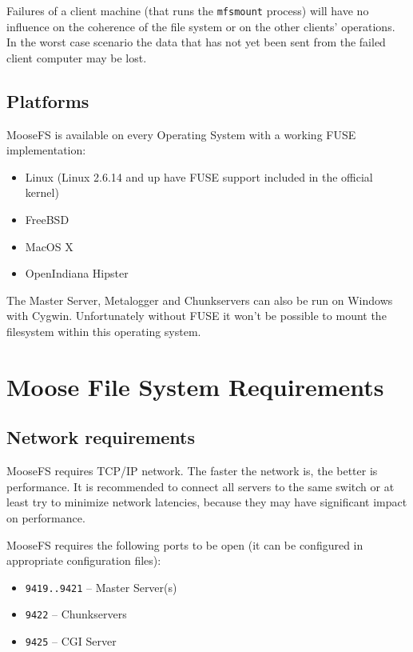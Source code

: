 \documentclass[a4paper,11pt,english]{report}
\def\code#1{\texttt{#1}}
\begin{document}
		Failures of a client machine (that runs the \code{mfsmount} process) will have no influence on the coherence of the file system or on the other clients' operations. In the worst case scenario the data that has not yet been sent from the failed client computer may be lost.
		
		\section{Platforms}
		MooseFS is available on every Operating System with a working FUSE implementation:
		\begin{itemize}
			\item Linux (Linux 2.6.14 and up have FUSE support included in the official kernel)
			\item FreeBSD
			\item MacOS X
			\item OpenIndiana Hipster
		\end{itemize}
	
		\bigskip	
		The Master Server, Metalogger and Chunkservers can also be run on Windows with Cygwin. Unfortunately without FUSE it won't be possible to mount the filesystem within this operating system.


	\chapter{Moose File System Requirements}

		\section{Network requirements}
		
		MooseFS requires TCP/IP network. The faster the network is, the better is performance. It is recommended to connect all servers to the same switch or at least try to minimize network latencies, because they may have significant impact on performance.
		
		MooseFS requires the following ports to be open (it can be configured in appropriate configuration files):
		
		\begin{itemize}
			\item \code{9419..9421} -- Master Server(s)
			\item \code{9422} -- Chunkservers
			\item \code{9425} -- CGI Server
		\end{itemize}
	
\end{document}
